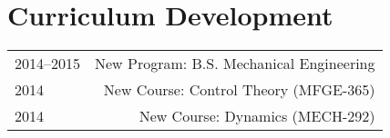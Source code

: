 \section*{Curriculum Development}
\begin{tabular}{L!{\VRule}R}
2014--2015&New Program: B.S. Mechanical Engineering\\
2014&New Course: Control Theory (MFGE-365)\\
2014&New Course: Dynamics (MECH-292)\\
\end{tabular}